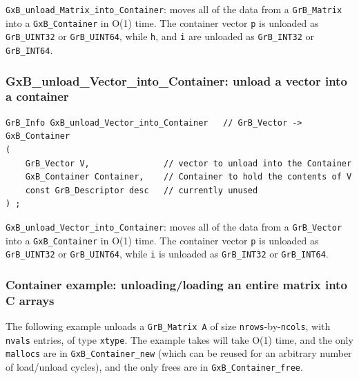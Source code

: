 \verb'GxB_unload_Matrix_into_Container': moves all of the data from
a \verb'GrB_Matrix' into a \verb'GxB_Container' in O(1) time.
The container vector \verb'p' is unloaded as \verb'GrB_UINT32' or \verb'GrB_UINT64',
while \verb'h', and \verb'i' are unloaded as \verb'GrB_INT32' or \verb'GrB_INT64'.

\subsubsection{{\sf GxB\_unload\_Vector\_into\_Container:} unload a vector into a container}
\label{unload_vector_into_container}

\begin{mdframed}[userdefinedwidth=6in]
{\footnotesize
\begin{verbatim}
GrB_Info GxB_unload_Vector_into_Container   // GrB_Vector -> GxB_Container
(
    GrB_Vector V,               // vector to unload into the Container
    GxB_Container Container,    // Container to hold the contents of V
    const GrB_Descriptor desc   // currently unused
) ;
\end{verbatim}
} \end{mdframed}

\verb'GxB_unload_Vector_into_Container': moves all of the data from
a \verb'GrB_Vector' into a \verb'GxB_Container' in O(1) time.
The container vector \verb'p' is unloaded as \verb'GrB_UINT32' or \verb'GrB_UINT64',
while \verb'i' is unloaded as \verb'GrB_INT32' or \verb'GrB_INT64'.

\subsubsection{Container example: unloading/loading an entire matrix into C arrays}
\label{container_example}

The following example unloads a
\verb'GrB_Matrix A' of size \verb'nrows'-by-\verb'ncols',
with \verb'nvals' entries, of type \verb'xtype'.  The example takes will take O(1) time,
and the only \verb'mallocs' are in \verb'GxB_Container_new' (which can be reused for
an arbitrary number of load/unload cycles), and the only frees are in
\verb'GxB_Container_free'.

